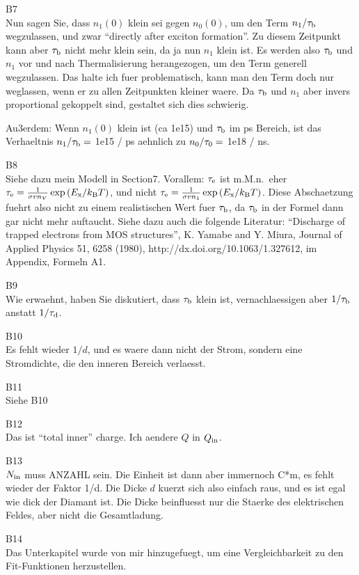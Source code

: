 B7\\
Nun sagen Sie, dass $n_1(0)$ klein sei gegen $n_0(0)$, um den Term $n_1 / \tau_{\textrm{b}}$ wegzulassen, und zwar ``directly after exciton formation''.
Zu diesem Zeitpunkt kann aber $\tau_{\textrm{b}}$ nicht mehr klein sein, da ja nun $n_1$ klein ist. 
Es werden also $\tau_{\textrm{b}}$ und $n_1$ vor und nach Thermalisierung herangezogen, um den Term generell wegzulassen. 
Das halte ich fuer problematisch, kann man den Term doch nur weglassen, wenn er zu allen Zeitpunkten kleiner waere. 
Da $\tau_{\textrm{b}}$ und $n_1$ aber invers proportional gekoppelt sind, gestaltet sich dies schwierig. 

Au3erdem: Wenn $n_1(0)$ klein ist (ca 1e15) und $\tau_{\textrm{b}}$ im ps Bereich, ist das Verhaeltnis $n_1 / \tau_{\textrm{b}} = $ 1e15 / ps aehnlich zu $n_0 / \tau_{0} = $ 1e18 / ns. 

B8\\
Siehe dazu mein Modell in Section7.
Vorallem: $\tau_\textrm{e}$ ist m.M.n.\ eher $\tau_\textrm{e} = \frac{1}{\sigma v n_V}\exp{\left( E_{\textrm{x}}/k_{\textrm{B}}T \right)}$, und nicht $\tau_\textrm{e} = \frac{1}{\sigma v n_1}\exp{\left( E_{\textrm{x}}/k_{\textrm{B}}T \right)}$.
Diese Abschaetzung fuehrt also nicht zu einem realistischen Wert fuer $\tau_{\textrm{b}}$, da $\tau_{\textrm{b}}$ in der Formel dann gar nicht mehr auftaucht. 
Siehe dazu auch die folgende Literatur: 
``Discharge of trapped electrons from MOS structures'', K. Yamabe and Y. Miura, Journal of Applied Physics 51, 6258 (1980), http://dx.doi.org/10.1063/1.327612, im Appendix, Formeln A1. 

B9\\
Wie erwaehnt, haben Sie diskutiert, dass $\tau_{\textrm{b}}$ klein ist, vernachlaessigen aber $1/\tau_{\textrm{b}}$ anstatt $1/\tau_{\textrm{d}}$. 

B10\\
Es fehlt wieder $1/d$, und es waere dann nicht der Strom, sondern eine Stromdichte, die den inneren Bereich verlaesst. 

B11\\
Siehe B10

B12\\
Das ist ``total inner'' charge. Ich aendere $Q$ in $Q_{\textrm{in}}$. 

B13\\
$N_{\textrm{in}}$ muss ANZAHL sein. Die Einheit ist dann aber immernoch C*m, es fehlt wieder der Faktor 1/d. 
Die Dicke $d$ kuerzt sich also einfach raus, und es ist egal wie dick der Diamant ist. Die Dicke beinfluesst nur die Staerke des elektrischen Feldes, aber nicht die Gesamtladung. 

B14\\
Das Unterkapitel wurde von mir hinzugefuegt, um eine Vergleichbarkeit zu den Fit-Funktionen herzustellen. 


